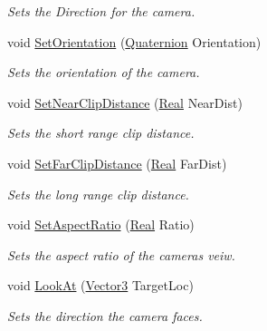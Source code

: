 \begin{DoxyCompactItemize}
\begin{DoxyCompactList}\small\item\em Sets the Direction for the camera. \item\end{DoxyCompactList}\item 
void \hyperlink{classphys_1_1Camera_af0822410414622c2a3c8b4da207b53ab}{SetOrientation} (\hyperlink{classphys_1_1Quaternion}{Quaternion} Orientation)
\begin{DoxyCompactList}\small\item\em Sets the orientation of the camera. \item\end{DoxyCompactList}\item 
void \hyperlink{classphys_1_1Camera_aff7cb792640b250cafdfbc333de4bbeb}{SetNearClipDistance} (\hyperlink{namespacephys_af7eb897198d265b8e868f45240230d5f}{Real} NearDist)
\begin{DoxyCompactList}\small\item\em Sets the short range clip distance. \item\end{DoxyCompactList}\item 
void \hyperlink{classphys_1_1Camera_a25408db8110ac5035fafbd58a5b1106d}{SetFarClipDistance} (\hyperlink{namespacephys_af7eb897198d265b8e868f45240230d5f}{Real} FarDist)
\begin{DoxyCompactList}\small\item\em Sets the long range clip distance. \item\end{DoxyCompactList}\item 
void \hyperlink{classphys_1_1Camera_a6f895759e653eedb985217c621b265f6}{SetAspectRatio} (\hyperlink{namespacephys_af7eb897198d265b8e868f45240230d5f}{Real} Ratio)
\begin{DoxyCompactList}\small\item\em Sets the aspect ratio of the cameras veiw. \item\end{DoxyCompactList}\item 
void \hyperlink{classphys_1_1Camera_a6534be5001bf06ab4c4b32a084629842}{LookAt} (\hyperlink{classphys_1_1Vector3}{Vector3} TargetLoc)
\begin{DoxyCompactList}\small\item\em Sets the direction the camera faces. \item\end{DoxyCompactList}\item 

\end{DoxyCompactItemize}
